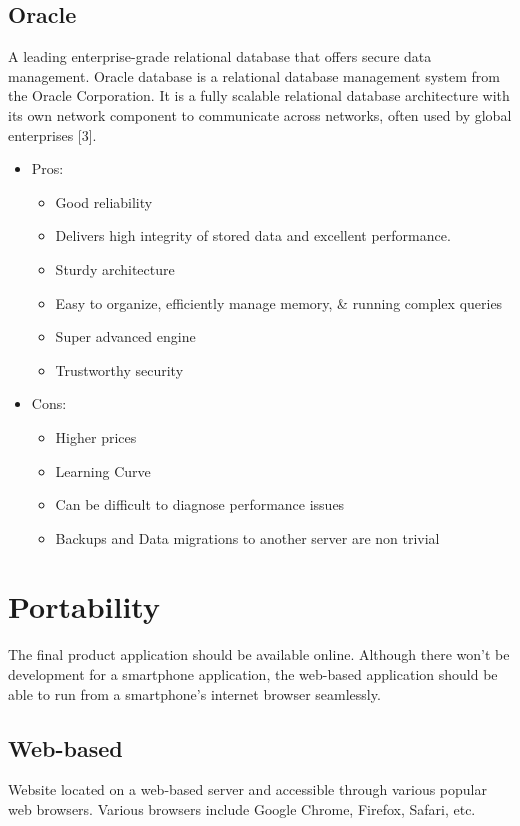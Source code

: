 \documentclass{article}
\begin{document}
\subsection{Oracle}
A leading enterprise-grade relational database that offers secure data management. Oracle database is a relational database management system from the Oracle Corporation. It is a fully scalable relational database architecture with its own network component to communicate across networks, often used by global enterprises [3].
\begin{itemize}
\item Pros:
\begin{itemize}
\item Good reliability
\item Delivers high integrity of stored data and excellent performance.
\item Sturdy architecture
\item Easy to organize, efficiently manage memory, \& running complex queries 
\item Super advanced engine
\item Trustworthy security
\end{itemize}
\item Cons:
\begin{itemize}
\item Higher prices
\item Learning Curve
\item Can be difficult to diagnose performance issues
\item Backups and Data migrations to another server are non trivial
\end{itemize}
\end{itemize}

\newpage
\section{Portability}
The final product application should be available online. Although there won't be development for a smartphone application, the web-based application should be able to run from a smartphone's internet browser seamlessly.
\newline

\subsection{Web-based}
Website located on a web-based server and accessible through various popular web browsers. Various browsers include Google Chrome, Firefox, Safari, etc.
\newline
\end{document}
